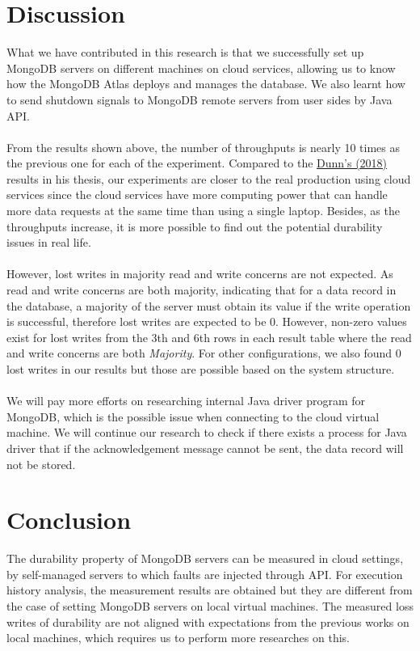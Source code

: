 \documentclass[12pt]{article}
\begin{document}
\section{Discussion}
What we have contributed in this research is that we successfully set up MongoDB servers on different machines on cloud services, allowing us to know how the MongoDB Atlas deploys and manages the database. We also learnt how to send shutdown signals to MongoDB remote servers from user sides by Java API. \\
\\
From the results shown above, the number of throughputs is nearly 10 times as the previous one for each of the experiment. Compared to the \hyperref[sec:reference]{Dunn's (2018)} results in his thesis, our experiments are closer to the real production using cloud services since the cloud services have more computing power that can handle more data requests at the same time than using a single laptop. Besides, as the throughputs increase, it is more possible to find out the potential durability issues in real life. \\
\\
However, lost writes in majority read and write concerns are not expected. As read and write concerns are both majority, indicating that for a data record in the database, a majority of the server must obtain its value if the write operation is successful, therefore lost writes are expected to be 0. However, non-zero values exist for lost writes from the 3th and 6th rows in each result table where the read and write concerns are both \textit{Majority}. For other configurations, we also found 0 lost writes in our results but those are possible based on the system structure.\\
\\
We will pay more efforts on researching internal Java driver program for MongoDB, which is the possible issue when connecting to the cloud virtual machine. We will continue our research to check if there exists a process for Java driver that if the acknowledgement message cannot be sent, the data record will not be stored.\\
\section{Conclusion}
The durability property of MongoDB servers can be measured in cloud settings, by self-managed servers to which faults are injected through API. For execution history analysis, the measurement results are obtained but they are different from the case of setting MongoDB servers on local virtual machines. The measured loss writes of durability are not aligned with expectations from the previous works on local machines, which requires us to perform more researches on this.\\
\end{document}

